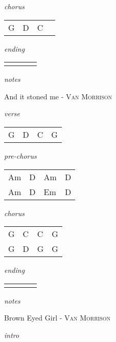 \documentclass[12pt]{article}
\begin{document}
\textit{chorus}

\begin{tabular}{|P{1.25in}|P{1.25in}|P{1.25in}|P{1.25in}|}
  G  &  D &  C &   \\
\end{tabular}

\textit{ending}

\begin{tabular}{|P{1.25in}|P{1.25in}|P{1.25in}|P{1.25in}|}
    &   &   &   \\
\end{tabular}

\textit{notes}

\newpage

{\Huge And it stoned me} {\huge - \textsc{Van Morrison}}

\huge


\textit{verse}

\begin{tabular}{|P{1.25in}|P{1.25in}|P{1.25in}|P{1.25in}|}
  G  &  D &  C &  G \\
\end{tabular}

\textit{pre-chorus}

\begin{tabular}{|P{1.25in}|P{1.25in}|P{1.25in}|P{1.25in}|}
  Am  &  D & Am  & D  \\
  Am  &  D & Em  & D  \\
\end{tabular}

\textit{chorus}

\begin{tabular}{|P{1.25in}|P{1.25in}|P{1.25in}|P{1.25in}|}
  G  &  C & C  & G  \\
  G  &  D & G  & G  \\
\end{tabular}


\textit{ending}

\begin{tabular}{|P{1.25in}|P{1.25in}|P{1.25in}|P{1.25in}|}
    &   &   &   \\
\end{tabular}

\textit{notes}

\newpage


{\Huge Brown Eyed Girl} {\huge - \textsc{Van Morrison}}

\huge
\textit{intro}
\end{document}
